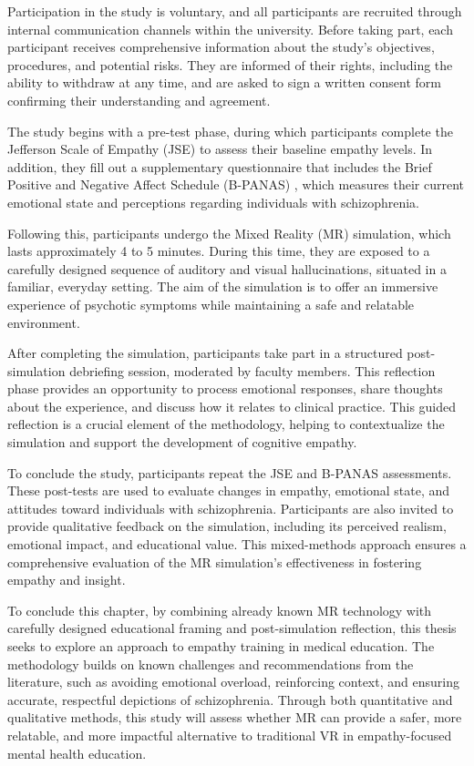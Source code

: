 Participation in the study is voluntary, and all participants are recruited through internal communication channels within the university. Before taking part, each participant receives comprehensive information about the study’s objectives, procedures, and potential risks. They are informed of their rights, including the ability to withdraw at any time, and are asked to sign a written consent form confirming their understanding and agreement.

The study begins with a pre-test phase, during which participants complete the Jefferson Scale of Empathy (JSE) \cite{Hojat2002} to assess their baseline empathy levels. In addition, they fill out a supplementary questionnaire that includes the Brief Positive and Negative Affect Schedule (B-PANAS) \cite{Boiroux2024}, which measures their current emotional state and perceptions regarding individuals with schizophrenia.

Following this, participants undergo the Mixed Reality (MR) simulation, which lasts approximately 4 to 5 minutes. During this time, they are exposed to a carefully designed sequence of auditory and visual hallucinations, situated in a familiar, everyday setting. The aim of the simulation is to offer an immersive experience of psychotic symptoms while maintaining a safe and relatable environment.

After completing the simulation, participants take part in a structured post-simulation debriefing session, moderated by faculty members. This reflection phase provides an opportunity to process emotional responses, share thoughts about the experience, and discuss how it relates to clinical practice. This guided reflection is a crucial element of the methodology, helping to contextualize the simulation and support the development of cognitive empathy.

To conclude the study, participants repeat the JSE and B-PANAS assessments. These post-tests are used to evaluate changes in empathy, emotional state, and attitudes toward individuals with schizophrenia. Participants are also invited to provide qualitative feedback on the simulation, including its perceived realism, emotional impact, and educational value. This mixed-methods approach ensures a comprehensive evaluation of the MR simulation’s effectiveness in fostering empathy and insight.

To conclude this chapter, by combining already known MR technology with carefully designed educational framing and post-simulation reflection, this thesis seeks to explore an approach to empathy training in medical education. The methodology builds on known challenges and recommendations from the literature, such as avoiding emotional overload, reinforcing context, and ensuring accurate, respectful depictions of schizophrenia. Through both quantitative and qualitative methods, this study will assess whether MR can provide a safer, more relatable, and more impactful alternative to traditional VR in empathy-focused mental health education.

